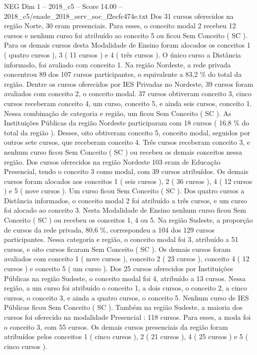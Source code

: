 \begin{textsample}{NEG Dim 1 – 2018\_c5 – Score 14.00 – 2018\_c5/enade\_2018\_serv\_soc\_f2ecfc474e.txt}
Dos 31 cursos oferecidos na região Norte, 30 eram presenciais.
Para esses, o conceito modal 2 recebeu 12 cursos e nenhum curso foi atribuído ao conceito 5 ou ficou Sem Conceito ( SC ).
Para os demais cursos desta Modalidade de Ensino foram alocados os conceitos 1 ( quatro cursos ), 3 ( 11 cursos ) e 4 ( três cursos ).
O único curso a Distância informado, foi avaliado com conceito 1.
Na região Nordeste, a rede privada concentrou 89 dos 107 cursos participantes, o equivalente a 83,2 \% do total da região.
Dentre os cursos oferecidos por IES Privadas no Nordeste, 39 cursos foram avaliados com conceito 2, o conceito modal. 37 cursos obtiveram conceito 3, cinco cursos receberam conceito 4, um curso, conceito 5, e ainda seis cursos, conceito 1.
Nessa combinação de categoria e região, um ficou Sem Conceito ( SC ).
As Instituições Públicas da região Nordeste participaram com 18 cursos ( 16,8 \% do total da região ).
Desses, oito obtiveram conceito 5, conceito modal, seguidos por outros sete cursos, que receberam conceito 4.
Três cursos receberam conceito 3, e nenhum curso ficou Sem Conceito ( SC ) ou recebeu os demais conceitos nessa região.
Dos cursos oferecidos na região Nordeste 103 eram de Educação Presencial, tendo o conceito 3 como modal, com 39 cursos atribuídos.
Os demais cursos foram alocados aos conceitos 1 ( seis cursos ), 2 ( 36 cursos ), 4 ( 12 cursos ) e 5 ( nove cursos ).
Um curso ficou Sem Conceito ( SC ).
Dos quatro cursos a Distância informados, o conceito modal 2 foi atribuído a três cursos, e um curso foi alocado ao conceito 3.
Nesta Modalidade de Ensino nenhum curso ficou Sem Conceito ( SC ) ou recebeu os conceitos 1, 4 ou 5.
Na região Sudeste, a proporção de cursos da rede privada, 80,6 \%, correspondeu a 104 dos 129 cursos participantes.
Nessa categoria e região, o conceito modal foi 3, atribuído a 51 cursos, e oito cursos ficaram Sem Conceito ( SC ).
Os demais cursos foram avaliados com conceito 1 ( nove cursos ), conceito 2 ( 23 cursos ), conceito 4 ( 12 cursos ) e conceito 5 ( um curso ).
Dos 25 cursos oferecidos por Instituições Públicas na região Sudeste, o conceito modal foi 4, atribuído a 13 cursos.
Nessa região, a um curso foi atribuído o conceito 1, a dois cursos, o conceito 2, a cinco cursos, o conceito 3, e ainda a quatro cursos, o conceito 5.
Nenhum curso de IES Públicas ficou Sem Conceito ( SC ).
Também na região Sudeste, a maioria dos cursos foi oferecido na modalidade Presencial : 118 cursos.
Para esses, a moda foi o conceito 3, com 55 cursos.
Os demais cursos presenciais da região foram atribuídos pelos conceitos 1 ( cinco cursos ), 2 ( 21 cursos ), 4 ( 25 cursos ) e 5 ( cinco cursos ).

\end{textsample}
